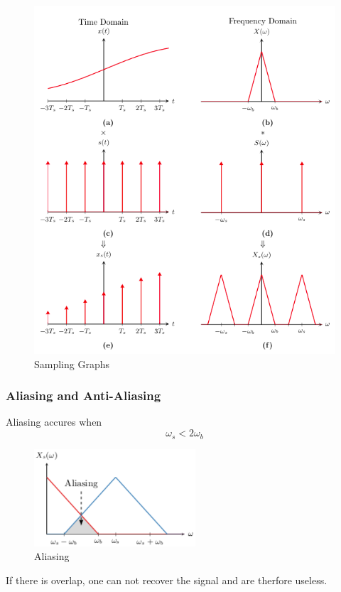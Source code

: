 \documentclass{article}
\begin{document}
\newpage
\begin{figure}[!h]
   \centering
   \includegraphics[width=12cm]{image/sampling_graphs.png} 
   \caption{Sampling Graphs}
   \label{fig:sampling_graphs}
\end{figure}


\newpage
\subsubsection{Aliasing and Anti-Aliasing}
Aliasing accures when 
\begin{equation*}
    \omega_s < 2\omega_b
\end{equation*}

\begin{figure}[!h]
    \centering
    \includegraphics[width=6cm]{image/aliasing.pdf}
    \caption{Aliasing}
    \label{fig:aliasing}
\end{figure}
If there is overlap, one can not recover the signal and are therfore useless.
\end{document}
